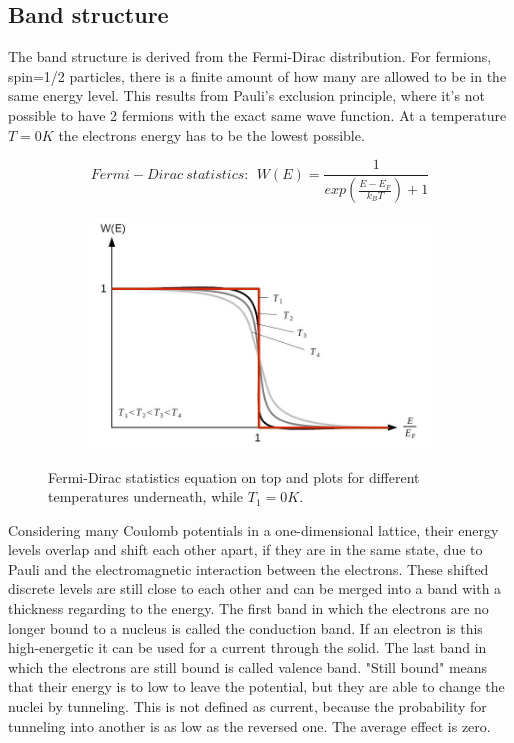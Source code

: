 \documentclass[]{article}
\begin{document}
\subsection{Band structure}
The band structure is derived from the Fermi-Dirac distribution. For fermions, spin=1/2 particles, there is a finite amount of how many are allowed to be in the same energy level. This results from Pauli's exclusion principle, where it's not possible to have 2 fermions with the exact same wave function. At a temperature $T=0K$ the electrons energy has to be the lowest possible. 
\begin{figure}[H]
\centering
\begin{subfigure}[b]{1\textwidth}
	\centering
	\begin{equation}
	Fermi-Dirac \ statistics: \:\: W(E) = \frac{1}{exp\left(\frac{E-E_F}{k_B T}\right)+1} 
	\end{equation}
\end{subfigure}
\begin{subfigure}[b]{1\textwidth}
	\includegraphics[width=1\textwidth]{Plots/fd.png}
\end{subfigure}
\caption{Fermi-Dirac statistics equation on top and plots for different temperatures underneath, while $T_1=0K$. \cite{wiki}}
\end{figure}

Considering many Coulomb potentials in a one-dimensional lattice, their energy levels overlap and shift each other apart, if they are in the same state, due to Pauli and the electromagnetic interaction between the electrons. These shifted discrete levels are still close to each other and can be merged into a band with a thickness regarding to the energy. The first band in which the electrons are no longer bound to a nucleus is called the conduction band. If an electron is this high-energetic it can be used for a current through the solid. The last band in which the electrons are still bound is called valence band. "Still bound" means that their energy is to low to leave the potential, but they are able to change the nuclei by tunneling. This is not defined as current, because the probability for tunneling into another is as low as the reversed one. The average effect is zero.
\end{document}
